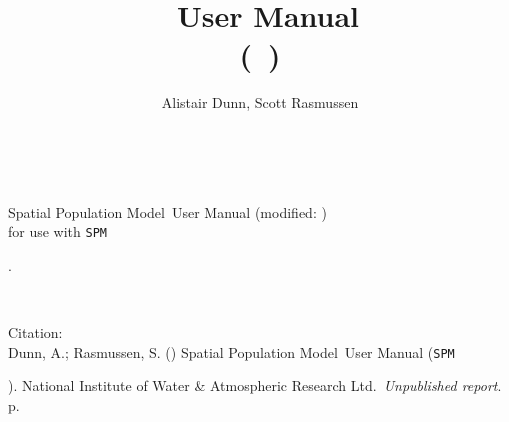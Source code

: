 \documentclass[11pt,twoside,pdftex]{article}
\title{\SPMName\ User Manual \\(\SPM\ \VER)} %
\author{Alistair Dunn, Scott Rasmussen}  %
\date{\DocDate} %
\renewcommand{\headrulewidth}{0pt} %
\newcommand{\DocYear}{\SourceControlYearDoc}
\newcommand{\DocVer}{\SourceControlDateDoc}
\newcommand{\VER}{\begin{small}\end{small}} %
\newcommand{\SPM}{\texttt{SPM}} %
\newcommand{\SPMName}{Spatial Population Model} %
\newcommand{\Organisation}{National Institute of Water \& Atmospheric Research Ltd.} %
\newcommand{\ManualRef}{Dunn, A.; Rasmussen, S. (\DocYear) \SPMName\ User Manual (\SPM\ \VER). \Organisation\ \emph{Unpublished report}. \pageref{LastPage} p.} %
\begin{document}

\maketitle
\thispagestyle{empty} %
~\vfill
\begin{center}
\SPMName\ User Manual (modified: \DocVer) \\ for use with \SPM\ \VER.
\end{center}

\cleardoublepage{}
\fancyfoot[C]{\thepage}
~\vfill
\begin{center}
{Citation:\\ \ManualRef}
\end{center}

\cleardoublepage{}
\begin{spacing}{0.6} %
\tableofcontents
\end{spacing}

\cleardoublepage{}
\renewcommand{\headrulewidth}{0.2pt}
\fancyhead[LE]{\slshape \nouppercase \rightmark} %
\fancyhead[RO]{\slshape \nouppercase \leftmark}  %


\cleardoublepage{}


\cleardoublepage{}


\cleardoublepage{}


\cleardoublepage{}


\cleardoublepage{}


\cleardoublepage{}
\sloppy %
\label{sec:syntax}
\cleardoublepage{}

\cleardoublepage{}

\cleardoublepage{}


\cleardoublepage{}

\end{document}
